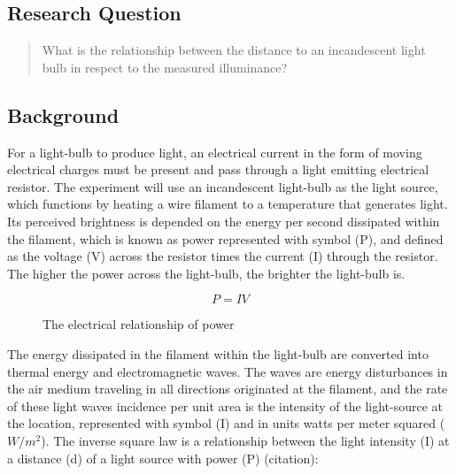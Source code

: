 \documentclass[a4paper,12pt]{article}
\begin{document}
\subsection{Research Question}
\begin{quote}
 What is the relationship between the distance to an incandescent light bulb in respect to the measured illuminance?
\end{quote}

\subsection{Background}

For a light-bulb to produce light, an electrical current in the form of moving electrical charges must be present and pass through a light emitting electrical resistor. The experiment will use an incandescent light-bulb as the light source, which functions by heating a wire filament to a temperature that generates light. Its perceived brightness is depended on the energy per second dissipated within the filament, which is known as power represented with symbol (P), and defined as the voltage (V) across the resistor times the current (I) through the resistor. The higher the power across the light-bulb, the brighter the light-bulb is.



\begin{figure}[h!]
    \[
    P = IV
    \]
    \caption{The electrical relationship of power}
    \label{eq:work}
\end{figure}

The energy dissipated in the filament within the light-bulb are converted into thermal energy and electromagnetic waves. The waves are energy disturbances in the air medium traveling in all directions originated at the filament, and the rate of these light waves incidence per unit area is the intensity of the light-source at the location, represented with symbol (I) and in units watts per meter squared ($\si{W/m^2}$). The  inverse square law is a relationship between the light intensity (I) at a distance (d) of a light source with power (P) (citation):
\end{document}
